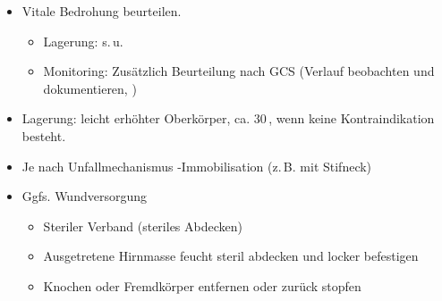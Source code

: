 \label{m:am-sht}\label{m:sht}
\begin{itemize}
  \item Vitale Bedrohung beurteilen. \par \TxBeiVit
  \TxMassVitMKBes
  \begin{itemize}
    \item Lagerung: s.\,u.
    \item Monitoring: Zusätzlich Beurteilung nach GCS (Verlauf beobachten und
    dokumentieren, )
  \end{itemize}
  \item Lagerung: leicht erhöhter Oberkörper, ca.
  30\,\textdegree{}, wenn keine Kontraindikation
  besteht.
  \item Je nach Unfallmechanismus -Immobilisation (z.\,B. mit Stifneck\texttrademark)
  \item Ggfs. Wundversorgung
  \begin{itemize}
    \item Steriler Verband (steriles Abdecken)
    \item Ausgetretene Hirnmasse feucht steril abdecken
        und locker befestigen
    \item Knochen oder Fremdkörper  entfernen oder zurück stopfen
  \end{itemize}
\end{itemize}